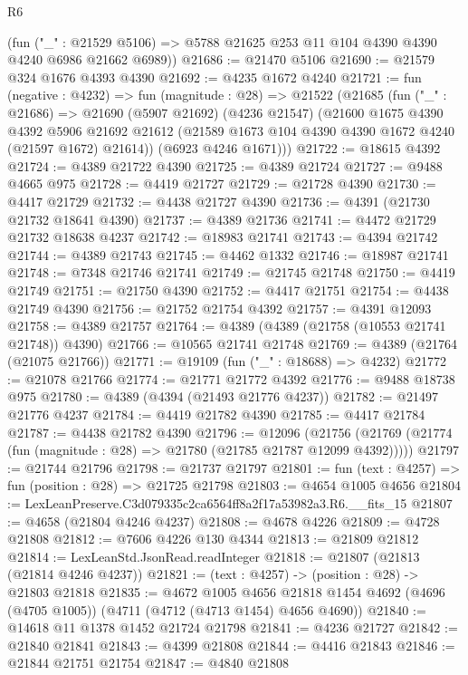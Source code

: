 \begin{lexlean}{R6}
\begin{coremodule}
      (fun ("_" : @21529 @5106) => @5788 @21625 @253 @11 @104 @4390 @4390 @4240 @6986 @21662 @6989))
@21686 := @21470 @5106
@21690 := @21579 @324 @1676 @4393 @4390
@21692 := @4235 @1672 @4240
@21721 := fun (negative : @4232) =>
  fun (magnitude : @28) =>
  @21522
    (@21685
      (fun ("_" : @21686) =>
      @21690
        (@5907 @21692)
        (@4236 @21547)
        (@21600
          @1675
          @4390
          @4392
          @5906
          @21692
          @21612
          (@21589 @1673 @104 @4390 @4390 @1672 @4240 (@21597 @1672) @21614))
        (@6923 @4246 @1671)))
@21722 := @18615 @4392
@21724 := @4389 @21722 @4390
@21725 := @4389 @21724
@21727 := @9488 @4665 @975
@21728 := @4419 @21727
@21729 := @21728 @4390
@21730 := @4417 @21729
@21732 := @4438 @21727 @4390
@21736 := @4391 (@21730 @21732 @18641 @4390)
@21737 := @4389 @21736
@21741 := @4472 @21729 @21732 @18638 @4237
@21742 := @18983 @21741
@21743 := @4394 @21742
@21744 := @4389 @21743
@21745 := @4462 @1332
@21746 := @18987 @21741
@21748 := @7348 @21746 @21741
@21749 := @21745 @21748
@21750 := @4419 @21749
@21751 := @21750 @4390
@21752 := @4417 @21751
@21754 := @4438 @21749 @4390
@21756 := @21752 @21754 @4392
@21757 := @4391 @12093
@21758 := @4389 @21757
@21764 := @4389 (@4389 (@21758 (@10553 @21741 @21748)) @4390)
@21766 := @10565 @21741 @21748
@21769 := @4389 (@21764 (@21075 @21766))
@21771 := @19109 (fun ("_" : @18688) => @4232)
@21772 := @21078 @21766
@21774 := @21771 @21772 @4392
@21776 := @9488 @18738 @975
@21780 := @4389 (@4394 (@21493 @21776 @4237))
@21782 := @21497 @21776 @4237
@21784 := @4419 @21782 @4390
@21785 := @4417 @21784
@21787 := @4438 @21782 @4390
@21796 := @12096
    (@21756 (@21769 (@21774 (fun (magnitude : @28) => @21780 (@21785 @21787 @12099 @4392)))))
@21797 := @21744 @21796
@21798 := @21737 @21797
@21801 := fun (text : @4257) => fun (position : @28) => @21725 @21798
@21803 := @4654 @1005 @4656
@21804 := LexLeanPreserve.C3d079335c2ca6564ff8a2f17a53982a3.R6.__fits_15
@21807 := @4658 (@21804 @4246 @4237)
@21808 := @4678 @4226
@21809 := @4728 @21808
@21812 := @7606 @4226 @130 @4344
@21813 := @21809 @21812
@21814 := LexLeanStd.JsonRead.readInteger
@21818 := @21807 (@21813 (@21814 @4246 @4237))
@21821 := (text : @4257) -> (position : @28) -> @21803 @21818
@21835 := @4672
    @1005
    @4656
    @21818
    @1454
    @4692
    (@4696 (@4705 @1005))
    (@4711 (@4712 (@4713 @1454) @4656 @4690))
@21840 := @14618 @11 @1378 @1452 @21724 @21798
@21841 := @4236 @21727
@21842 := @21840 @21841
@21843 := @4399 @21808
@21844 := @4416 @21843
@21846 := @21844 @21751 @21754
@21847 := @4840 @21808

\end{coremodule}
\end{lexlean}
